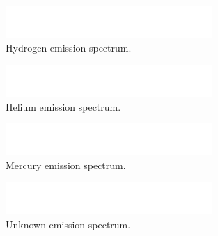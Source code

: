 \documentclass{article}
\begin{document}
\begin{figure}[h!]
\centering
\includegraphics[width=0.7\textwidth]{images/BlankSpectrum}
\caption{Hydrogen emission spectrum.\label{fig:cont}}
\end{figure}

\begin{figure}[h!]
\centering
\includegraphics[width=0.7\textwidth]{images/BlankSpectrum}
\caption{Helium emission spectrum.\label{fig:cont}}
\end{figure}

\begin{figure}[h!]
\centering
\includegraphics[width=0.7\textwidth]{images/BlankSpectrum}
\caption{Mercury emission spectrum.\label{fig:cont}}
\end{figure}

\begin{figure}[h!]
\centering
\includegraphics[width=0.7\textwidth]{images/BlankSpectrum}
\caption{Unknown emission spectrum.\label{fig:cont}}
\end{figure}
\end{document}
